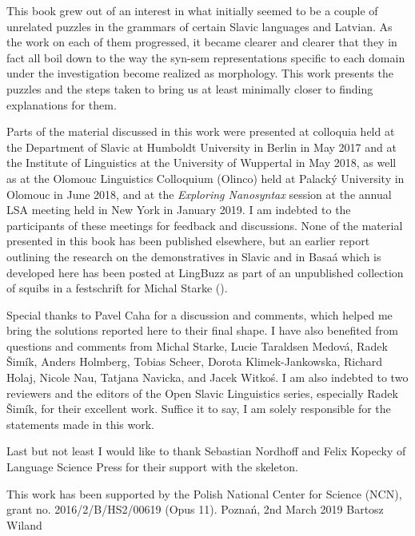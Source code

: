 
This book grew out of an interest in what initially seemed to be a couple of unrelated puzzles in the grammars of certain Slavic languages and Latvian. As the work on each of them progressed, it became clearer and clearer that they in fact all boil down to the way the syn-sem representations specific to each domain under the investigation become realized as morphology. This work presents the puzzles and the steps taken to bring us at least minimally closer to finding explanations for them.
\par
Parts of the material discussed in this work were presented at colloquia held at the Department of Slavic at Humboldt University in Berlin in May 2017 and at the Institute of Linguistics at the University of Wuppertal in May 2018, as well as at the Olomouc Linguistics Colloquium (Olinco) held at Palack\'y University in Olomouc in June 2018, and at the \textit{Exploring Nanosyntax} session at the annual LSA meeting held in New York in January 2019. I am indebted to the participants of these meetings for feedback and discussions. None of the material presented in this book has been published elsewhere, but an earlier report outlining the research on the demonstratives in Slavic and in Basa\'a which is developed here has been posted at LingBuzz as part of an unpublished collection of squibs in a festschrift for Michal Starke (\citealt{WilandTUM}). 
\par 
Special thanks to  Pavel Caha for a discussion and comments, which helped me bring the solutions reported here to their final shape.
I have also benefited from questions and comments from Michal Starke,   Lucie Taraldsen Medov\'a,   Radek \v{S}im\'ik,   Anders Holmberg,  Tobias Scheer,   Dorota Klimek-Jankowska,  Richard Holaj,  Nicole Nau,   Tatjana Navicka, and  Jacek Witko\'s. I am also indebted to two reviewers and the editors of the Open Slavic Linguistics series, especially Radek \v{S}im\'ik, for their excellent work. Suffice it to say, I am solely responsible for the statements made in this work. 
\par
Last but not least I would like to thank  Sebastian Nordhoff  and Felix Kopecky  of Language Science Press for their support with the \XeLaTeX{} skeleton.
 \par
 This work has been supported by the Polish National Center for Science (NCN), grant no. 2016/2/B/HS2/00619 (Opus 11).
\bigbreak
\noindent 
Pozna\'n, 2nd March 2019 \hfill Bartosz Wiland


\begin{refsection}
\printbibliography[heading=subbibliography]
\end{refsection}

